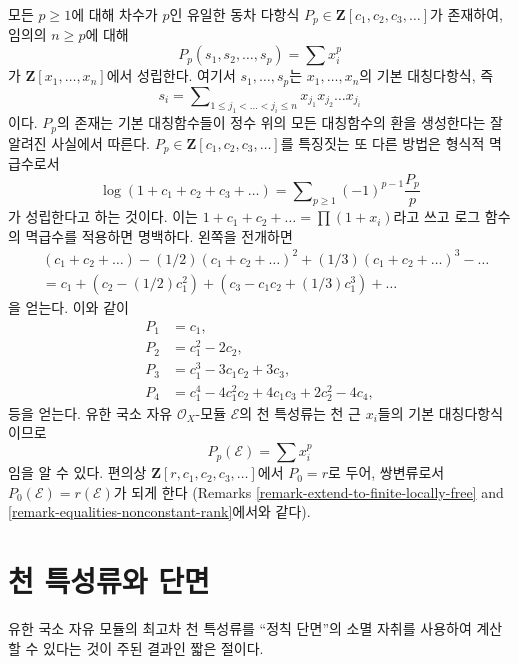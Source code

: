 \begin{example}
\label{example-power-sum}
모든 $p \geq 1$에 대해 차수가 $p$인 유일한 동차 다항식
$P_p \in \mathbf{Z}[c_1, c_2, c_3, \ldots]$가 존재하여, 임의의
$n \geq p$에 대해
$$
P_p(s_1, s_2, \ldots, s_p) = \sum x_i^p
$$
가 $\mathbf{Z}[x_1, \ldots, x_n]$에서 성립한다. 여기서
$s_1, \ldots, s_p$는 $x_1, \ldots, x_n$의 기본 대칭다항식, 즉
$$
s_i = \sum\nolimits_{1 \leq j_1 < \ldots < j_i \leq n}
x_{j_1}x_{j_2} \ldots x_{j_i}
$$
이다. $P_p$의 존재는 기본 대칭함수들이 정수 위의 모든 대칭함수의 환을
생성한다는 잘 알려진 사실에서 따른다.
$P_p \in \mathbf{Z}[c_1, c_2, c_3, \ldots]$를 특징짓는 또 다른 방법은
형식적 멱급수로서
$$
\log(1 + c_1 + c_2 + c_3 + \ldots) =
\sum\nolimits_{p \geq 1} (-1)^{p - 1}\frac{P_p}{p}
$$
가 성립한다고 하는 것이다. 이는
$1 + c_1 + c_2 + \ldots = \prod (1 + x_i)$라고 쓰고 로그 함수의
멱급수를 적용하면 명백하다. 왼쪽을 전개하면
\begin{align*}
& (c_1 + c_2 + \ldots) - (1/2)(c_1 + c_2 + \ldots)^2 +
(1/3)(c_1 + c_2 + \ldots)^3 - \ldots \\
& =
c_1 + (c_2 - (1/2)c_1^2) + (c_3 - c_1c_2 + (1/3)c_1^3) + \ldots
\end{align*}
을 얻는다. 이와 같이
\begin{align*}
P_1 & = c_1, \\
P_2 & = c_1^2 - 2c_2, \\
P_3 & = c_1^3 - 3c_1c_2 + 3c_3, \\
P_4 & = c_1^4 - 4c_1^2c_2 + 4c_1c_3 + 2c_2^2 - 4c_4,
\end{align*}
등을 얻는다. 유한 국소 자유 $\mathcal{O}_X$-모듈 $\mathcal{E}$의
천 특성류는 천 근 $x_i$들의 기본 대칭다항식이므로
$$
P_p(\mathcal{E}) = \sum x_i^p
$$
임을 알 수 있다. 편의상
$\mathbf{Z}[r, c_1, c_2, c_3, \ldots]$에서 $P_0 = r$로 두어,
쌍변류로서 $P_0(\mathcal{E}) = r(\mathcal{E})$가 되게 한다
(Remarks \ref{remark-extend-to-finite-locally-free} and
\ref{remark-equalities-nonconstant-rank}에서와 같다).
\end{example}






\section{천 특성류와 단면}
\label{section-top-chern-class}

\noindent
유한 국소 자유 모듈의 최고차 천 특성류를 “정칙 단면”의 소멸 자취를
사용하여 계산할 수 있다는 것이 주된 결과인 짧은 절이다.

